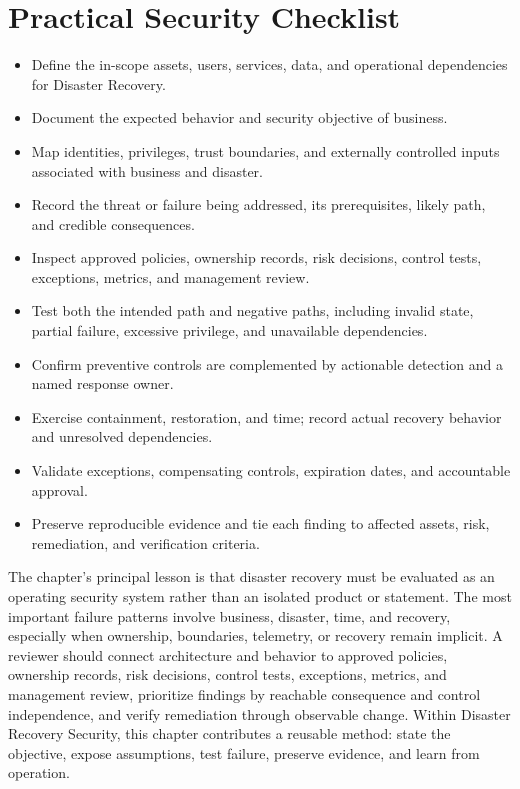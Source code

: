 \documentclass[11pt]{article}
\begin{document}
\section*{Practical Security Checklist}
\begin{itemize}[label=$\square$]
\item Define the in-scope assets, users, services, data, and operational dependencies for Disaster Recovery.
\item Document the expected behavior and security objective of business.
\item Map identities, privileges, trust boundaries, and externally controlled inputs associated with business and disaster.
\item Record the threat or failure being addressed, its prerequisites, likely path, and credible consequences.
\item Inspect approved policies, ownership records, risk decisions, control tests, exceptions, metrics, and management review.
\item Test both the intended path and negative paths, including invalid state, partial failure, excessive privilege, and unavailable dependencies.
\item Confirm preventive controls are complemented by actionable detection and a named response owner.
\item Exercise containment, restoration, and time; record actual recovery behavior and unresolved dependencies.
\item Validate exceptions, compensating controls, expiration dates, and accountable approval.
\item Preserve reproducible evidence and tie each finding to affected assets, risk, remediation, and verification criteria.
\end{itemize}
\begin{synthesisbox}
The chapter's principal lesson is that disaster recovery must be evaluated as an operating security system rather than an isolated product or statement. The most important failure patterns involve business, disaster, time, and recovery, especially when ownership, boundaries, telemetry, or recovery remain implicit. A reviewer should connect architecture and behavior to approved policies, ownership records, risk decisions, control tests, exceptions, metrics, and management review, prioritize findings by reachable consequence and control independence, and verify remediation through observable change. Within Disaster Recovery Security, this chapter contributes a reusable method: state the objective, expose assumptions, test failure, preserve evidence, and learn from operation.
\end{synthesisbox}
\end{document}
